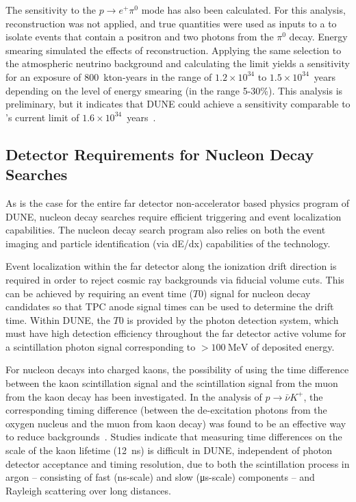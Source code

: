 The sensitivity to the $p \rightarrow e^{+} \pi^0$ mode has also been calculated. For this analysis, reconstruction was not applied, and true quantities were used as inputs to a  to isolate events that contain a positron and two photons from the $\pi^0$ decay.  Energy smearing simulated the effects of reconstruction.  Applying the same selection to the atmospheric neutrino background and calculating the limit yields a sensitivity for an exposure of 800~kton-years in the range of $1.2 \times 10^{34}$ to $1.5 \times 10^{34}$~years depending on the level of energy smearing (in the range 5-30\%).  This analysis is preliminary, but it indicates that DUNE could achieve a sensitivity comparable to \superk's current limit of $1.6 \times 10^{34}$~years~\cite{Miura:2016krn}.

\subsection{Detector Requirements for Nucleon Decay Searches}
\label{subsec:nonaccel-ndk-requirements}

As is the case for the entire far detector non-accelerator 
based physics program of DUNE, nucleon decay searches require 
efficient triggering and event localization  
capabilities. The nucleon decay search program also relies 
on both the event imaging and particle identification 
(via dE/dx) capabilities of the \lartpc technology.  

Event localization within the far detector along the ionization 
drift direction is required in order to reject cosmic ray 
backgrounds via fiducial volume cuts. This can be achieved by 
requiring an event time ($T0$) signal for nucleon decay 
candidates so that TPC anode signal times can be used to 
determine the drift time.  Within DUNE, the $T0$ is provided by 
the photon detection system, which must have high detection 
efficiency throughout the far detector active volume for a 
scintillation photon signal corresponding to 
$>\SI{100}{\MeV}$ of deposited energy.

For nucleon decays into charged kaons, the possibility of using 
the time difference between the kaon scintillation signal and 
the scintillation signal from the muon from the kaon decay has 
been investigated.  
In the \superk analysis of $p\to\bar{\nu} K^{+}$, the 
corresponding timing difference (between the de-excitation 
photons from the oxygen nucleus and the muon from kaon decay) 
was found to be an effective way to reduce
backgrounds~\cite{Abe:2014mwa}.  
Studies indicate that measuring time differences on the scale 
of the kaon lifetime (\SI{12}{\ns}) is difficult in DUNE, 
independent of photon detector acceptance and timing resolution, 
due to both the scintillation process in argon 
-- consisting of fast (\si{\ns}-scale) and slow (\si{\micro\second}-scale) components --  and 
Rayleigh scattering over long distances.

